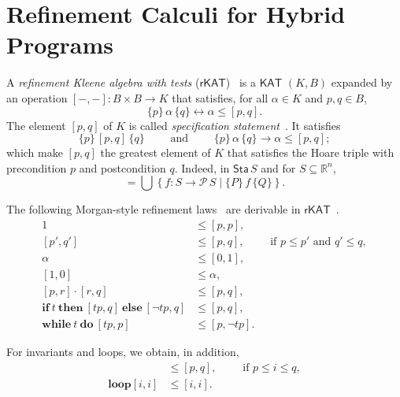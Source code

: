 \documentclass[envcountsames]{llncs}
\newcommand{\IF}[3]{\mathbf{if}\ #1\ \mathbf{then}\ #2\ \mathbf{else}\ #3}
\newcommand{\WHILE}[2]{\mathbf{while}\ #1\ \mathbf{do}\ #2}
\newcommand{\KAT}{\mathsf{KAT}}
\newcommand{\rKAT}{\mathsf{rKAT}}
\newcommand{\Pow}{\mathcal{P}}
\newcommand{\reals}{\mathbb{R}}
\newcommand{\sta}{\mathsf{Sta}}
\begin{document}

\section{Refinement Calculi for Hybrid Programs}\label{sec:refine}

A \emph{refinement Kleene algebra with tests}
($\rKAT$)~\cite{ArmstrongGS16}  is a $\KAT$
$(K,B)$ expanded by an operation $[-,-]:B\times B\to K$ that
satisfies, for all $\alpha \in K$ and $p,q\in B$, 
\begin{equation*}
  \{p\}\, \alpha\, \{q\} \leftrightarrow \alpha\le [p,q].
\end{equation*}
The element $[p,q]$ of $K$ is called \emph{specification
  statement}~\cite{Morgan94}. It satisfies 
\begin{equation*}
  \{p\}\, [p,q]\, \{q\}\qquad \text{ and }\qquad \{p\}\, \alpha\, \{q\} \rightarrow \alpha\le [p,q];
\end{equation*}
which make $[p,q]$ the greatest element of $K$ that satisfies the Hoare
triple with precondition $p$ and postcondition $q$.  Indeed, in
$\sta\, S$ and for $S\subseteq \reals^n$,
\begin{equation*}
  [P,Q] = \bigcup \left\{f:S\to \Pow\, S \mid \{P\}\, f\, \{Q\}\right\}.
\end{equation*}

The following Morgan-style refinement laws~\cite{Morgan94} are derivable in
$\rKAT$~\cite{ArmstrongGS16}. 
\begin{align}
  1 &\le [p,p],\label{eq:r-skip}\tag{r-skip}\\
[p',q'] &\le [p,q],\qquad \text{ if } p\le p'\text{ and } q'\le q,\label{eq:r-cons}\tag{r-cons}\\
\alpha & \le [0,1],\\
[1,0] &\le \alpha,\\
[p,r]\cdot [r,q] &\le [p,q],\label{eq:r-seq}\tag{r-seq}\\
\IF{t}{[tp,q]}{[\neg tp,q]} &\le [p,q],\label{eq:r-cond}\tag{r-cond}\\
 \WHILE{t}{[tp,p]} &\le [p,\neg tp]. \label{eq:r-while}\tag{r-while}
\end{align}

For invariants and loops, we obtain, in addition, 
\begin{align}
  [i,i] &\le [p,q],\qquad \text{ if } p\le i \le q,\label{eq:r-inv}\tag{r-inv}\\
\mathbf{loop} [i,i] &\le [i,i]. \label{eq:r-loop}\tag{r-loop}
\end{align}
\end{document}
